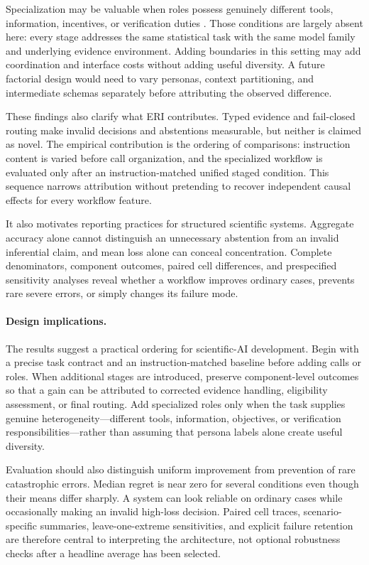 Specialization may be valuable when roles possess genuinely different tools,
information, incentives, or verification duties
\citep{HongEtAl2024MetaGPT}.  Those conditions are largely absent here: every
stage addresses the same statistical task with the same model family and
underlying evidence environment.  Adding boundaries in this setting may add
coordination and interface costs without adding useful diversity.  A future
factorial design would need to vary personas, context partitioning, and
intermediate schemas separately before attributing the observed difference.

These findings also clarify what ERI contributes.  Typed evidence and
fail-closed routing make invalid decisions and abstentions measurable, but
neither is claimed as novel.  The empirical contribution is the ordering of
comparisons: instruction content is varied before call organization, and the
specialized workflow is evaluated only after an instruction-matched unified
staged condition.  This sequence narrows attribution without pretending to
recover independent causal effects for every workflow feature.

It also motivates reporting practices for structured scientific systems.
Aggregate accuracy alone cannot distinguish an unnecessary abstention from an
invalid inferential claim, and mean loss alone can conceal concentration.
Complete denominators, component outcomes, paired cell differences, and
prespecified sensitivity analyses reveal whether a workflow improves ordinary
cases, prevents rare severe errors, or simply changes its failure mode.

\paragraph{Design implications.}
The results suggest a practical ordering for scientific-AI development.
Begin with a precise task contract and an instruction-matched baseline before
adding calls or roles.  When additional stages are introduced, preserve
component-level outcomes so that a gain can be attributed to corrected
evidence handling, eligibility assessment, or final routing.  Add specialized
roles only when the task supplies genuine heterogeneity---different tools,
information, objectives, or verification responsibilities---rather than
assuming that persona labels alone create useful diversity.

Evaluation should also distinguish uniform improvement from prevention of
rare catastrophic errors.  Median regret is near zero for several conditions
even though their means differ sharply.  A system can look reliable on
ordinary cases while occasionally making an invalid high-loss decision.
Paired cell traces, scenario-specific summaries, leave-one-extreme
sensitivities, and explicit failure retention are therefore central to
interpreting the architecture, not optional robustness checks after a headline
average has been selected.


